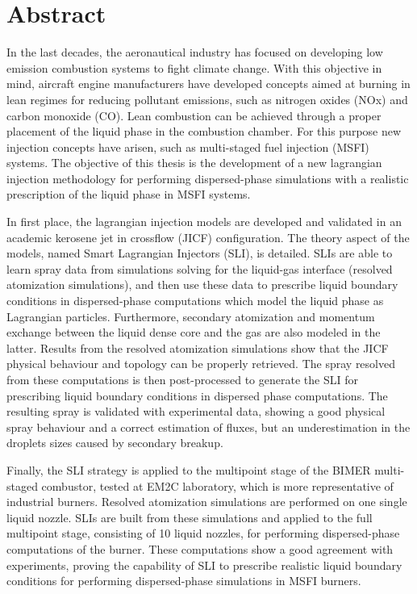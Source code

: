 \chapter*{Abstract}
    
In the last decades, the aeronautical industry has focused on developing low emission combustion systems to fight climate change. With this objective in mind, aircraft engine manufacturers have developed concepts aimed at burning in lean regimes for reducing pollutant emissions, such as nitrogen oxides (NOx) and carbon monoxide (CO). Lean combustion can be achieved through a proper placement of the liquid phase in the combustion chamber. For this purpose new injection concepts have arisen, such as multi-staged fuel injection (MSFI) systems. The objective of this thesis is the development of a new lagrangian injection methodology for performing dispersed-phase simulations with a realistic prescription of the liquid phase in MSFI systems.

In first place, the lagrangian injection models are developed and validated in an academic kerosene jet in crossflow (JICF) configuration. The theory aspect of the models, named Smart Lagrangian Injectors (SLI), is detailed. SLIs are able to learn spray data from simulations solving for the liquid-gas interface (resolved atomization simulations), and then use these data to prescribe liquid boundary conditions in dispersed-phase computations which model the liquid phase as Lagrangian particles. Furthermore, secondary atomization and momentum exchange between the liquid dense core and the gas are also modeled in the latter.  Results from the resolved atomization simulations show that the JICF physical behaviour and topology can be properly retrieved. The spray resolved from these computations is then post-processed to generate the SLI for prescribing liquid boundary conditions in dispersed phase computations. The resulting spray is validated with experimental data, showing a good physical spray behaviour and a correct estimation of fluxes, but an underestimation in the droplets sizes caused by secondary breakup. 

Finally, the SLI strategy is applied to the multipoint stage of the BIMER multi-staged combustor, tested at EM2C laboratory, which is more representative of industrial burners. Resolved atomization simulations are performed on one single liquid nozzle. SLIs are built from these simulations and applied to the full multipoint stage, consisting of 10 liquid nozzles, for performing dispersed-phase computations of the burner. These computations show a good agreement with experiments, proving the capability of SLI to prescribe realistic liquid boundary conditions for performing dispersed-phase simulations in MSFI burners.
